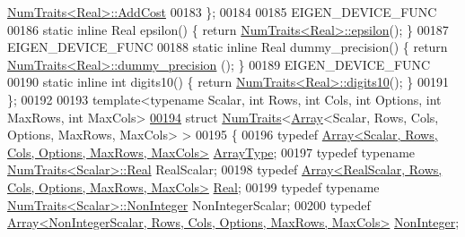 \begin{DoxyCode}
      \hyperlink{group___core___module_struct_eigen_1_1_num_traits}{NumTraits<Real>::AddCost}
00183   \};
00184 
00185   EIGEN\_DEVICE\_FUNC
00186   \textcolor{keyword}{static} \textcolor{keyword}{inline} Real epsilon() \{ \textcolor{keywordflow}{return} \hyperlink{group___core___module_struct_eigen_1_1_num_traits}{NumTraits<Real>::epsilon}(); \}
00187   EIGEN\_DEVICE\_FUNC
00188   \textcolor{keyword}{static} \textcolor{keyword}{inline} Real dummy\_precision() \{ \textcolor{keywordflow}{return} \hyperlink{group___core___module_struct_eigen_1_1_num_traits}{NumTraits<Real>::dummy\_precision}
      (); \}
00189   EIGEN\_DEVICE\_FUNC
00190   \textcolor{keyword}{static} \textcolor{keyword}{inline} \textcolor{keywordtype}{int} digits10() \{ \textcolor{keywordflow}{return} \hyperlink{group___core___module_struct_eigen_1_1_num_traits}{NumTraits<Real>::digits10}(); \}
00191 \};
00192 
00193 \textcolor{keyword}{template}<\textcolor{keyword}{typename} Scalar, \textcolor{keywordtype}{int} Rows, \textcolor{keywordtype}{int} Cols, \textcolor{keywordtype}{int} Options, \textcolor{keywordtype}{int} MaxRows, \textcolor{keywordtype}{int} MaxCols>
\hyperlink{struct_eigen_1_1_num_traits_3_01_array_3_01_scalar_00_01_rows_00_01_cols_00_01_options_00_01_max_rows_00_01_max_cols_01_4_01_4}{00194} \textcolor{keyword}{struct }\hyperlink{group___core___module_struct_eigen_1_1_num_traits}{NumTraits}<\hyperlink{group___core___module_class_eigen_1_1_array}{Array}<Scalar, Rows, Cols, Options, MaxRows, MaxCols> >
00195 \{
00196   \textcolor{keyword}{typedef} \hyperlink{group___core___module_class_eigen_1_1_array}{Array<Scalar, Rows, Cols, Options, MaxRows, MaxCols>}
       \hyperlink{group___core___module_class_eigen_1_1_array}{ArrayType};
00197   \textcolor{keyword}{typedef} \textcolor{keyword}{typename} \hyperlink{group___core___module_struct_eigen_1_1_num_traits}{NumTraits<Scalar>::Real} RealScalar;
00198   \textcolor{keyword}{typedef} \hyperlink{group___core___module_class_eigen_1_1_array}{Array<RealScalar, Rows, Cols, Options, MaxRows, MaxCols>}
       \hyperlink{group___core___module_class_eigen_1_1_array}{Real};
00199   \textcolor{keyword}{typedef} \textcolor{keyword}{typename} \hyperlink{group___core___module_struct_eigen_1_1_num_traits}{NumTraits<Scalar>::NonInteger} NonIntegerScalar;
00200   \textcolor{keyword}{typedef} \hyperlink{group___core___module_class_eigen_1_1_array}{Array<NonIntegerScalar, Rows, Cols, Options, MaxRows, MaxCols>}
       \hyperlink{group___core___module_class_eigen_1_1_array}{NonInteger};

\end{DoxyCode}
